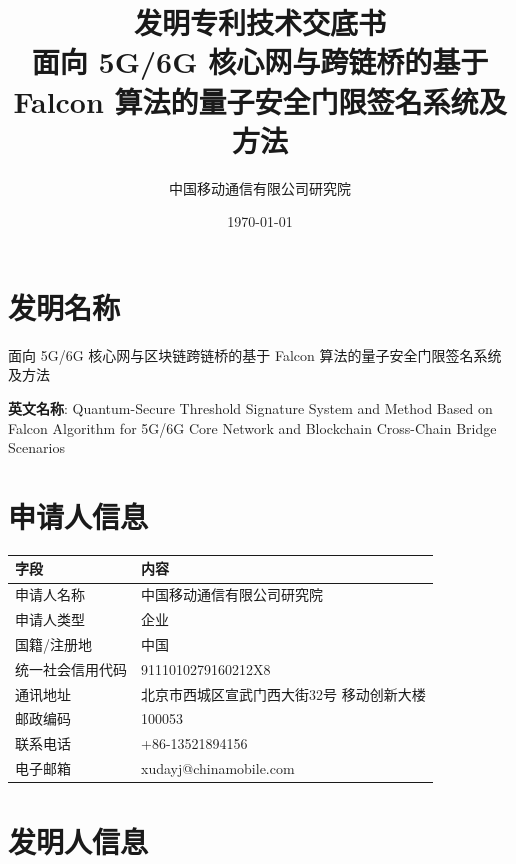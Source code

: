 \documentclass[12pt,a4paper]{article}
\title{\textbf{发明专利技术交底书} \\[0.5em]
\Large 面向 5G/6G 核心网与跨链桥的基于 Falcon 算法的量子安全门限签名系统及方法}
\author{中国移动通信有限公司研究院}
\date{\today}
\begin{document}
\maketitle

\tableofcontents
\newpage

\section{发明名称}

面向 5G/6G 核心网与区块链跨链桥的基于 Falcon 算法的量子安全门限签名系统及方法

\textbf{英文名称}: Quantum-Secure Threshold Signature System and Method Based on Falcon Algorithm for 5G/6G Core Network and Blockchain Cross-Chain Bridge Scenarios

\section{申请人信息}

\begin{table}[h]
\centering
\begin{tabular}{|p{4cm}|p{8cm}|}
\hline
\textbf{字段} & \textbf{内容} \\
\hline
申请人名称 & 中国移动通信有限公司研究院 \\
\hline
申请人类型 & 企业 \\
\hline
国籍/注册地 & 中国 \\
\hline
统一社会信用代码 & 9111010279160212X8 \\
\hline
通讯地址 & 北京市西城区宣武门西大街32号 移动创新大楼 \\
\hline
邮政编码 & 100053 \\
\hline
联系电话 & +86-13521894156 \\
\hline
电子邮箱 & xudayj@chinamobile.com \\
\hline
\end{tabular}
\end{table}

\section{发明人信息}
\end{document}
